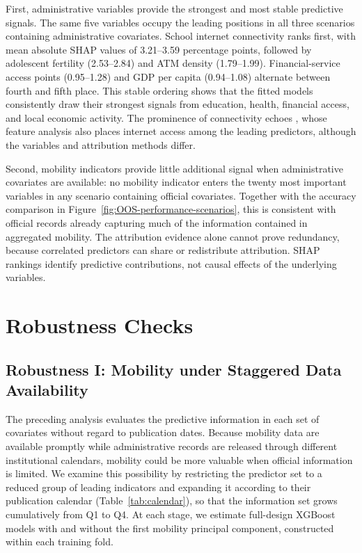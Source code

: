 \documentclass[pdflatex,sn-apa]{sn-jnl}
\begin{document}
First, administrative variables provide the strongest and most stable predictive signals. The same five variables occupy the leading positions in all three scenarios containing administrative covariates. School internet connectivity ranks first, with mean absolute SHAP values of 3.21--3.59 percentage points, followed by adolescent fertility (2.53--2.84) and ATM density (1.79--1.99). Financial-service access points (0.95--1.28) and GDP per capita (0.94--1.08) alternate between fourth and fifth place. This stable ordering shows that the fitted models consistently draw their strongest signals from education, health, financial access, and local economic activity. The prominence of connectivity echoes \citet{Corral2025}, whose feature analysis also places internet access among the leading predictors, although the variables and attribution methods differ.

Second, mobility indicators provide little additional signal when administrative covariates are available: no mobility indicator enters the twenty most important variables in any scenario containing official covariates. Together with the accuracy comparison in Figure~\ref{fig:OOS-performance-scenarios}, this is consistent with official records already capturing much of the information contained in aggregated mobility. The attribution evidence alone cannot prove redundancy, because correlated predictors can share or redistribute attribution. SHAP rankings identify predictive contributions, not causal effects of the underlying variables.


\section{Robustness Checks}
\label{sec:robustness}

\subsection{Robustness I: Mobility under Staggered Data Availability}
\label{sec:staggered-availability}

The preceding analysis evaluates the predictive information in each set of covariates without regard to publication dates. Because mobility data are available promptly while administrative records are released through different institutional calendars, mobility could be more valuable when official information is limited. We examine this possibility by restricting the predictor set to a reduced group of leading indicators and expanding it according to their publication calendar (Table~\ref{tab:calendar}), so that the information set grows cumulatively from Q1 to Q4. At each stage, we estimate full-design XGBoost models with and without the first mobility principal component, constructed within each training fold.
\end{document}
